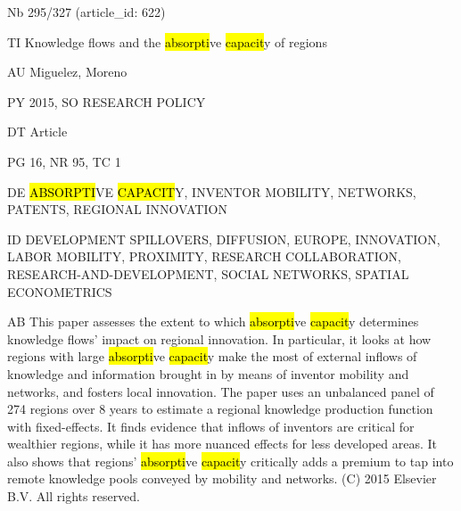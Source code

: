 \documentclass[a4paper]{article}
\begin{document}
\vspace*{-2cm}
Nb \tabto{0cm}295/327 (article\_id: 622)\par
TI \tabto{0cm}Knowledge flows and the \hl{absorpti}ve \hl{capacit}y of regions\par
AU \tabto{0cm}Miguelez, Moreno\par
PY \tabto{0cm}2015, SO RESEARCH POLICY\par
DT \tabto{0cm}Article\par
PG \tabto{0cm}16, NR 95, TC 1\par
DE \tabto{0cm}\hl{ABSORPTI}VE \hl{CAPACIT}Y, INVENTOR MOBILITY, NETWORKS, PATENTS, REGIONAL INNOVATION\par
ID \tabto{0cm}DEVELOPMENT SPILLOVERS, DIFFUSION, EUROPE, INNOVATION, LABOR MOBILITY, PROXIMITY, RESEARCH COLLABORATION, RESEARCH-AND-DEVELOPMENT, SOCIAL NETWORKS, SPATIAL ECONOMETRICS\par
AB \tabto{0cm}This paper assesses the extent to which \hl{absorpti}ve \hl{capacit}y determines knowledge flows' impact on regional innovation. In particular, it looks at how regions with large \hl{absorpti}ve \hl{capacit}y make the most of external inflows of knowledge and information brought in by means of inventor mobility and networks, and fosters local innovation. The paper uses an unbalanced panel of 274 regions over 8 years to estimate a regional knowledge production function with fixed-effects. It finds evidence that inflows of inventors are critical for wealthier regions, while it has more nuanced effects for less developed areas. It also shows that regions' \hl{absorpti}ve \hl{capacit}y critically adds a premium to tap into remote knowledge pools conveyed by mobility and networks. (C) 2015 Elsevier B.V. All rights reserved.\par
\clearpage
\end{document}
